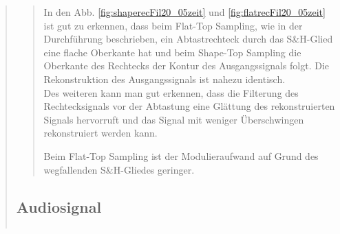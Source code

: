 \begin{quote}
\begin{quote}
       In den Abb. \ref{fig:shaperecFil20_05zeit} und \ref{fig:flatrecFil20_05zeit} ist gut zu erkennen, dass beim
       Flat-Top Sampling, wie in der Durchführung beschrieben, ein Abtastrechteck durch das S\&H-Glied eine flache
       Oberkante hat und beim Shape-Top Sampling die Oberkante des Rechtecks der Kontur des Ausgangssignals folgt. 
       Die Rekonstruktion des Ausgangssignals ist nahezu identisch.\\
       Des weiteren kann man gut erkennen, dass die Filterung des Rechtecksignals vor der Abtastung eine Glättung des
       rekonstruierten Signals hervorruft und das Signal mit weniger Überschwingen rekonstruiert werden kann.
       
       Beim Flat-Top Sampling ist der Modulieraufwand auf Grund des wegfallenden S\&H-Gliedes geringer.
       
    
      \end{quote}
      
      \subsection{Audiosignal}
      \begin{quote}
      
      \begin{center}
            \begin{tabular}{ll}
            

\end{tabular}
\end{center}
\end{quote}
\end{quote}
